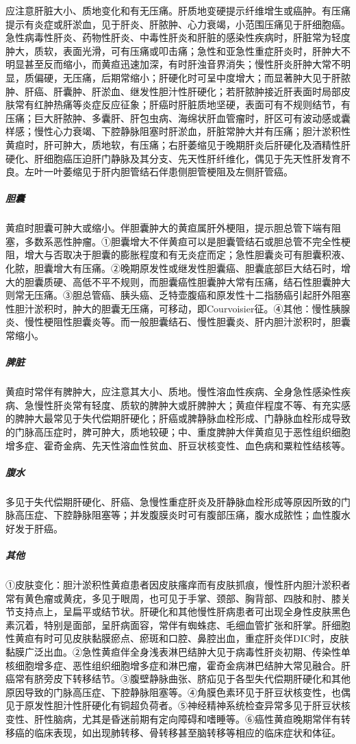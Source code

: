 应注意肝脏大小、质地变化和有无压痛。肝质地变硬提示纤维增生或癌肿。有压痛提示有炎症或肝淤血，见于肝炎、肝脓肿、心力衰竭，小范围压痛见于肝细胞癌。急性病毒性肝炎、药物性肝炎、中毒性肝炎和肝脏的感染性疾病时，肝脏常为轻度肿大，质软，表面光滑，可有压痛或叩击痛；急性和亚急性重症肝炎时，肝肿大不明显甚至反而缩小，而黄疸迅速加深，有时肝浊音界消失；慢性肝炎肝肿大常不明显，质偏硬，无压痛，后期常缩小；肝硬化时可呈中度增大；而显著肿大见于肝脓肿、肝癌、肝囊肿、肝淤血、继发性胆汁性肝硬化；若肝脓肿接近肝表面时局部皮肤常有红肿热痛等炎症反应征象；肝癌时肝脏质地坚硬，表面可有不规则结节，有压痛；巨大肝脓肿、多囊肝、肝包虫病、海绵状肝血管瘤时，肝区可有波动感或囊样感；慢性心力衰竭、下腔静脉阻塞时肝淤血，肝脏常肿大并有压痛；胆汁淤积性黄疸时，肝可肿大，质地软，有压痛；右肝萎缩见于晚期肝炎后肝硬化及酒精性肝硬化、肝细胞癌压迫肝门静脉及其分支、先天性肝纤维化，偶见于先天性肝发育不良。左叶一叶萎缩见于肝内胆管结石伴患侧胆管梗阻及左侧肝管癌。

\subparagraph{胆囊}

黄疸时胆囊可肿大或缩小。伴胆囊肿大的黄疸属肝外梗阻，提示胆总管下端有阻塞，多数系恶性肿瘤。①胆囊增大不伴黄疸可以是胆囊管结石或胆总管不完全性梗阻，增大与否取决于胆囊的膨胀程度和有无炎症而定；急性胆囊炎可有胆囊积液、化脓，胆囊增大有压痛。②晚期原发性或继发性胆囊癌、胆囊底部巨大结石时，增大的胆囊质硬、高低不平不规则，而胆囊癌性胆囊肿大常有压痛，结石性胆囊肿大则常无压痛。③胆总管癌、胰头癌、乏特壶腹癌和原发性十二指肠癌引起肝外阻塞性胆汁淤积时，肿大的胆囊无压痛，可移动，即Courvoisier征。④其他：慢性胰腺炎、慢性梗阻性胆囊炎等。而一般胆囊结石、慢性胆囊炎、肝内胆汁淤积时，胆囊常缩小。

\subparagraph{脾脏}

黄疸时常伴有脾肿大，应注意其大小、质地。慢性溶血性疾病、全身急性感染性疾病、急慢性肝炎常有轻度、质软的脾肿大或肝脾肿大；黄疸伴程度不等、有充实感的脾肿大最常见于失代偿期肝硬化；肝癌或脾静脉血栓形成、门静脉血栓形成导致的门脉高压症时，脾可肿大，质地较硬；中、重度脾肿大伴黄疸见于恶性组织细胞增多症、霍奇金病、先天性溶血性贫血、肝豆状核变性、血色病和粟粒性结核等。

\subparagraph{腹水}

多见于失代偿期肝硬化、肝癌、急慢性重症肝炎及肝静脉血栓形成等原因所致的门脉高压症、下腔静脉阻塞等；并发腹膜炎时可有腹部压痛，腹水成脓性；血性腹水好发于肝癌。

\subparagraph{其他}

①皮肤变化：胆汁淤积性黄疸患者因皮肤瘙痒而有皮肤抓痕，慢性肝内胆汁淤积者常有黄色瘤或黄疣，多见于眼周，也可见于手掌、颈部、胸背部、四肢和肘、膝关节支持点上，呈扁平或结节状。肝硬化和其他慢性肝病患者可出现全身性皮肤黑色素沉着，特别是面部，呈肝病面容，常伴有蜘蛛痣、毛细血管扩张和肝掌。肝细胞性黄疸有时可见皮肤黏膜瘀点、瘀斑和口腔、鼻腔出血，重症肝炎伴DIC时，皮肤黏膜广泛出血。②急性黄疸伴全身浅表淋巴结肿大见于病毒性肝炎初期、传染性单核细胞增多症、恶性组织细胞增多症和淋巴瘤，霍奇金病淋巴结肿大常见融合。肝癌常有脐旁皮下转移结节。③腹壁静脉曲张、脐疝见于各型失代偿期肝硬化和其他原因导致的门脉高压症、下腔静脉阻塞等。④角膜色素环见于肝豆状核变性，也偶见于原发性胆汁性肝硬化有铜超负荷者。⑤神经精神系统检查异常多见于肝豆状核变性、肝性脑病，尤其是昏迷前期有定向障碍和嗜睡等。⑥癌性黄疸晚期常伴有转移癌的临床表现，如出现肺转移、骨转移甚至脑转移等相应的临床症状和体征。

